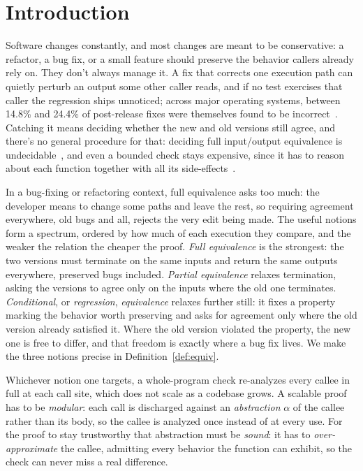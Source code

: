 \documentclass[conference]{IEEEtran}
\theoremstyle{definition}
\theoremstyle{remark}
\begin{document}
\section{Introduction}\label{sec:intro}

Software changes constantly, and most changes are meant to be
conservative: a refactor, a bug fix, or a small feature should preserve
the behavior callers already rely on. They don't always manage it. A fix
that corrects one execution path can quietly perturb an output some
other caller reads, and if no test exercises that caller the regression
ships unnoticed; across major operating systems, between 14.8\% and
24.4\% of post-release fixes were themselves found to be
incorrect~\cite{yin2011fixes}.
Catching it means deciding whether the new and old versions still
agree, and there's no general procedure for that: deciding full
input/output equivalence is undecidable~\cite{rice1953}, and even a
bounded check stays expensive, since it has to reason about each
function together with all its side-effects~\cite{godlin2013rv}.

In a bug-fixing or refactoring context, full equivalence asks too much:
the developer means to change some paths and leave the rest, so
requiring agreement everywhere, old bugs and all, rejects the very edit
being made. The useful notions form a spectrum, ordered by how much of
each execution they compare, and the weaker the relation the cheaper the
proof. \emph{Full equivalence} is the strongest: the two versions must
terminate on the same inputs and return the same outputs everywhere,
preserved bugs included. \emph{Partial equivalence} relaxes termination,
asking the versions to agree only on the inputs where the old one
terminates. \emph{Conditional}, or \emph{regression}, \emph{equivalence}
relaxes further still: it fixes a property marking the behavior worth
preserving and asks for agreement only where the old version already
satisfied it. Where the old version violated the property, the new one
is free to differ, and that freedom is exactly where a bug fix lives. We
make the three notions precise in Definition~\ref{def:equiv}.

Whichever notion one targets, a whole-program check re-analyzes every
callee in full at each call site, which does not scale as a codebase
grows. A scalable proof has to be \emph{modular}: each call is
discharged against an \emph{abstraction} $\alpha$ of the callee rather
than its body, so the callee is analyzed once instead of at every use.
For the proof to stay trustworthy that abstraction must be \emph{sound}:
it has to \emph{over-approximate} the callee, admitting every behavior
the function can exhibit, so the check can never miss a real difference.
\end{document}
